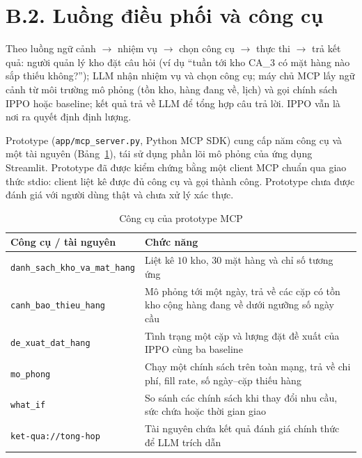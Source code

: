 \section*{B.2. Luồng điều phối và công cụ}

Theo luồng ngữ cảnh $\rightarrow$ nhiệm vụ $\rightarrow$ chọn công cụ
$\rightarrow$ thực thi $\rightarrow$ trả kết quả: người quản lý kho đặt câu hỏi
(ví dụ ``tuần tới kho CA\_3 có mặt hàng nào sắp thiếu không?''); LLM nhận nhiệm
vụ và chọn công cụ; máy chủ MCP lấy ngữ cảnh từ môi trường mô phỏng (tồn kho,
hàng đang về, lịch) và gọi chính sách IPPO hoặc baseline; kết quả trả về LLM để
tổng hợp câu trả lời. IPPO vẫn là nơi ra quyết định định lượng.

Prototype (\texttt{app/mcp\_server.py}, Python MCP SDK) cung cấp năm công cụ và
một tài nguyên (Bảng~\ref{tab:congCuMCP}), tái sử dụng phần lõi mô phỏng của ứng
dụng Streamlit. Prototype đã được kiểm chứng bằng một client MCP chuẩn qua giao
thức stdio: client liệt kê được đủ công cụ và gọi thành công. Prototype chưa
được đánh giá với người dùng thật và chưa xử lý xác thực.

\begin{table}[htbp]
    \centering
    \caption{Công cụ của prototype MCP}
    \label{tab:congCuMCP}
    \small
    \begin{tabular}{lp{9.2cm}}
        \toprule
        \textbf{Công cụ / tài nguyên} & \textbf{Chức năng} \\
        \midrule
        \texttt{danh\_sach\_kho\_va\_mat\_hang} & Liệt kê $10$ kho, $30$ mặt hàng và chỉ số tương ứng \\
        \texttt{canh\_bao\_thieu\_hang} & Mô phỏng tới một ngày, trả về các cặp có tồn kho cộng hàng đang về dưới ngưỡng số ngày cầu \\
        \texttt{de\_xuat\_dat\_hang} & Tình trạng một cặp và lượng đặt đề xuất của IPPO cùng ba baseline \\
        \texttt{mo\_phong} & Chạy một chính sách trên toàn mạng, trả về chi phí, fill rate, số ngày--cặp thiếu hàng \\
        \texttt{what\_if} & So sánh các chính sách khi thay đổi nhu cầu, sức chứa hoặc thời gian giao \\
        \texttt{ket-qua://tong-hop} & Tài nguyên chứa kết quả đánh giá chính thức để LLM trích dẫn \\
        \bottomrule
    \end{tabular}
\end{table}
